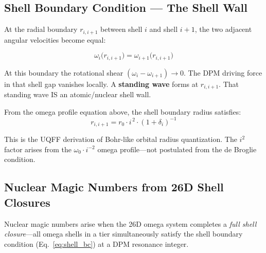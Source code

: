 \documentclass[12pt,a4paper]{article}
\begin{document}
\subsection{Shell Boundary Condition --- The Shell Wall}

At the radial boundary $r_{i,i+1}$ between shell $i$ and shell $i+1$, the two
adjacent angular velocities become equal:

\begin{equation}
  \omega_i\bigl(r_{i,i+1}\bigr) = \omega_{i+1}\bigl(r_{i,i+1}\bigr)
  \label{eq:shell_bc}
\end{equation}

At this boundary the rotational shear $(\omega_i - \omega_{i+1}) \to 0$.
The DPM driving force in that shell gap vanishes locally.
A \textbf{standing wave} forms at $r_{i,i+1}$.
That standing wave IS an atomic/nuclear shell wall.

From the omega profile equation above, the shell boundary radius satisfies:
\begin{equation}
  r_{i,i+1} = r_0 \cdot i^{\,2} \cdot (1 + \delta_i)^{-1}
  \label{eq:shell_radius}
\end{equation}

This is the UQFF derivation of Bohr-like orbital radius quantization.
The $i^2$ factor arises from the $\omega_0 \cdot i^{-2}$ omega profile---not
postulated from the de Broglie condition.

\subsection{Nuclear Magic Numbers from 26D Shell Closures}

Nuclear magic numbers arise when the 26D omega system completes a
\emph{full shell closure}---all omega shells in a tier simultaneously satisfy
the shell boundary condition (Eq.~\ref{eq:shell_bc}) at a DPM resonance integer.
\end{document}
